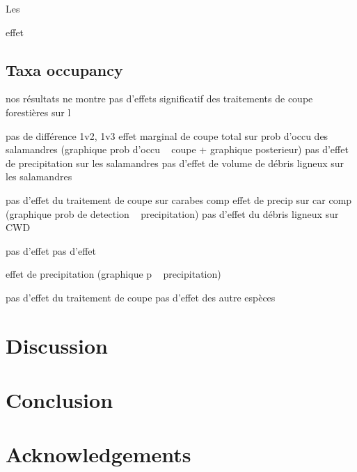 Les 



effet 
\subsection*{Taxa occupancy}
\label{subsec:taxa}

nos résultats ne montre pas d'effets significatif des traitements de coupe forestières sur l

pas de différence 1v2, 1v3
effet marginal de coupe total sur prob d'occu des salamandres (graphique prob d'occu ~ coupe + graphique posterieur)
pas d'effet de precipitation sur les salamandres
pas d'effet de volume de débris ligneux sur les salamandres

pas d'effet du traitement de coupe sur carabes comp
effet de precip sur car comp (graphique prob de detection ~ precipitation)
pas d'effet du débris ligneux sur CWD

pas d'effet
pas d'effet

effet de precipitation (graphique p ~ precipitation)

 pas d'effet du traitement de coupe
 pas d'effet des autre espèces



\clearpage

\section*{Discussion}
\label{sec:discu1}

\section*{Conclusion}
\label{sec:conclu1}

\section*{Acknowledgements}
\label{sec:acknowl1}


